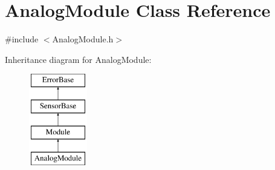 \hypertarget{classAnalogModule}{
\section{AnalogModule Class Reference}
\label{classAnalogModule}
}


{\ttfamily \#include $<$AnalogModule.h$>$}

Inheritance diagram for AnalogModule:\begin{figure}[H]
\begin{center}
\leavevmode
\includegraphics[height=4.000000cm]{classAnalogModule}
\end{center}
\end{figure}
